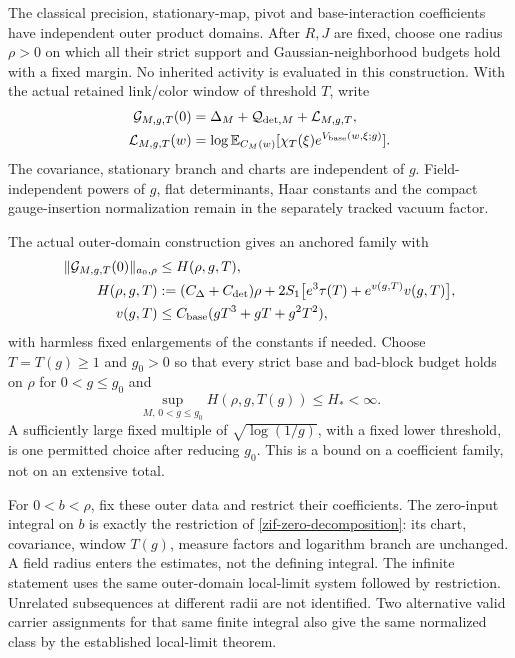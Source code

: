 \documentclass[11pt]{article}
\theoremstyle{remark}
\begin{document}
The classical precision, stationary-map, pivot and base-interaction
coefficients have independent outer product domains. After $R,J$
are fixed, choose one radius $\rho>0$ on which all their strict
support and Gaussian-neighborhood budgets hold with a fixed
margin. No inherited activity is evaluated in this construction.
With the actual retained link/color window of threshold $T$, write
\begin{align}
 \mathcal G_{M,g,T}(0)
   &=\Delta_M+\mathcal Q_{{\rm det},M}
                         +\mathcal L_{M,g,T},\notag\\
 \mathcal L_{M,g,T}(w)
   &=\log\mathbb E_{C_M(w)}
             [\chi_T(\xi)e^{V_{\rm base}(w,\xi;g)}].
 \label{zif-zero-decomposition}
\end{align}
The covariance, stationary branch and charts are independent of
$g$. Field-independent powers of $g$, flat determinants, Haar
constants and the compact gauge-insertion normalization remain
in the separately tracked vacuum factor.

The actual outer-domain construction gives an anchored family
with
\begin{align}
 \|\mathcal G_{M,g,T}(0)\|_{a_0,\rho}
 &\le H(\rho,g,T),\notag\\
 H(\rho,g,T)
 &:=(C_\Delta+C_{\rm det})\rho
       +2S_1\bigl[e^3\tau(T)+e^{v(g,T)}v(g,T)\bigr],\notag\\
 v(g,T)&\le C_{\rm base}(gT^3+gT+g^2T^2),
 \label{zif-outer-bound}
\end{align}
with harmless fixed enlargements of the constants if needed.
Choose $T=T(g)\ge1$ and $g_0>0$ so that every strict base and
bad-block budget holds on $\rho$ for $0<g\le g_0$ and
\begin{equation}
 \sup_{M,\,0<g\le g_0}H(\rho,g,T(g))\le H_*<\infty.
 \label{zif-uniform-outer}
\end{equation}
A sufficiently large fixed multiple of
$\sqrt{\log(1/g)}$, with a fixed lower threshold, is one
permitted choice after reducing $g_0$. This is a bound on a
coefficient family, not on an extensive total.

For $0<b<\rho$, fix these outer data and restrict their
coefficients. The zero-input integral on $b$ is exactly the
restriction of \eqref{zif-zero-decomposition}: its chart,
covariance, window $T(g)$, measure factors and logarithm branch
are unchanged. A field radius enters the estimates, not the
defining integral. The infinite statement uses the same
outer-domain local-limit system followed by restriction.
Unrelated subsequences at different radii are not identified.
Two alternative valid carrier assignments for that same finite
integral also give the same normalized class by the established
local-limit theorem.
\end{document}

